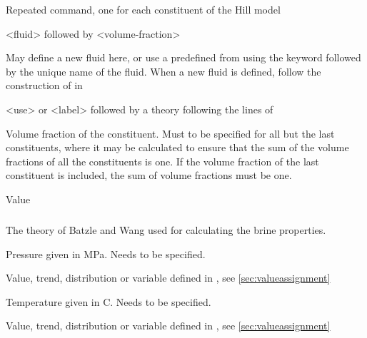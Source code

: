 {
 \slist
   \item \Description Repeated command, one for each constituent of the Hill model
   \item \Argument <fluid> followed by <volume-fraction>
   \item \Default
 \elist

 \slist
   \item \Description May define a new fluid here, or use a predefined  from  using the keyword  followed by the unique name of the fluid. When a new fluid is defined, follow the construction of  in 
   \item \Argument <use> or <label> followed by a theory following the lines of 
   \item \Default
 \elist

 \slist
   \item \Description Volume fraction of the constituent. Must to be specified for all but the last constituents, where it may be calculated to ensure that the sum of the volume fractions of all the constituents is one. If the volume fraction of the last constituent is included, the sum of volume fractions must be one.
   \item \Argument Value
   \item \Default
 \elist

\subparagraph{}
 \slist
   \item \Description The theory of Batzle and Wang used for calculating the brine properties.
   \item \Argument
   \item \Default
 \elist

 \slist
   \item \Description Pressure given in MPa. Needs to be specified.
   \item \Argument Value, trend, distribution or variable defined in , see \autoref{sec:valueassignment}
   \item \Default
 \elist

 \slist
   \item \Description Temperature given in C. Needs to be specified.
   \item \Argument Value, trend, distribution or variable defined in , see \autoref{sec:valueassignment}
   \item \Default
 \elist

}
